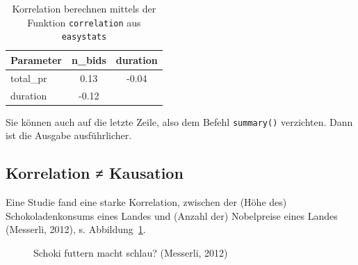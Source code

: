 \documentclass[
  letterpaper,
]{scrbook}
\theoremstyle{definition}
\theoremstyle{definition}
\theoremstyle{definition}
\theoremstyle{remark}
\begin{document}
\begin{longtable}[]{@{}lcc@{}}

\caption{\label{tbl-mario-corr1}Korrelation berechnen mittels der
Funktion \texttt{correlation} aus \texttt{easystats}}

\tabularnewline

\toprule\noalign{}
Parameter & n\_bids & duration \\
\midrule\noalign{}
\endhead
\bottomrule\noalign{}
\endlastfoot
total\_pr & 0.13 & -0.04 \\
duration & -0.12 & \\

\end{longtable}

Sie können auch auf die letzte Zeile, also dem Befehl \texttt{summary()}
verzichten. Dann ist die Ausgabe ausführlicher.

\subsection{Korrelation ≠ Kausation}\label{korrelation-kausation}

Eine Studie fand eine starke Korrelation, zwischen der (Höhe des)
Schokoladenkonsums eines Landes und (Anzahl der) Nobelpreise eines
Landes (Messerli, 2012), s. Abbildung~\ref{fig-schoki}.

\begin{figure}


\caption{\label{fig-schoki}Schoki futtern macht schlau? (Messerli,
2012)}

\end{figure}%
\end{document}
